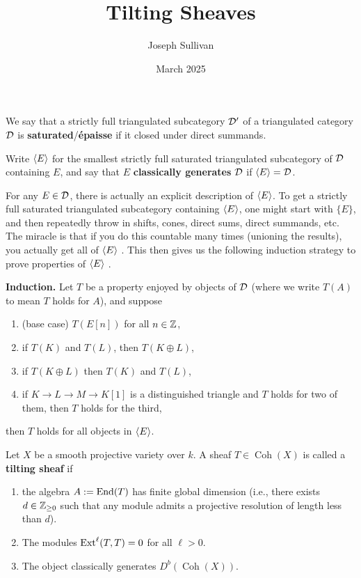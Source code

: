 \documentclass[12pt]{article}
\title{Tilting Sheaves}
\author{Joseph Sullivan}
\date{March 2025}
\DeclareMathOperator{\End}{End}
\DeclareMathOperator{\Coh}{Coh}
\begin{document}
\maketitle

\section{}

\begin{defn}
    We say that a strictly full triangulated subcategory $\mathcal{D}'$ of a triangulated category $\mathcal{D}$ is \textbf{saturated}/\textbf{\'epaisse} if it closed under direct summands.

    Write $\left\langle E\right\rangle$ for the smallest strictly full saturated triangulated subcategory of $\mathcal{D}$ containing $E$, and say that $E$ \textbf{classically generates} $\mathcal{D}$ if $\left\langle E\right\rangle=\mathcal{D}$.
\end{defn}

\begin{rmk}\label{induction-triangulated-cat}
    For any $E\in \mathcal{D}$, there is actually an explicit description of $\left\langle E\right\rangle$. To get a strictly full saturated triangulated subcategory containing $\left\langle E\right\rangle$, one might start with $\{E\}$, and then repeatedly throw in shifts, cones, direct sums, direct summands, etc. The miracle is that if you do this countable many times (unioning the results), you actually get all of $\left\langle E\right\rangle$ \cite[Lemma 13.36.2]{stacks-project}. This then gives us the following induction strategy to prove properties of $\left\langle E\right\rangle$ \cite[Remark 13.36.7]{stacks-project}.

    \textbf{Induction.} Let $T$ be a property enjoyed by objects of $\mathcal{D}$ (where we write $T(A)$ to mean $T$ holds for $A$), and suppose
    \begin{enumerate}[(1)]
        \item (base case) $T(E[n])$ for all $n\in \mathbb{Z}$,
        \item if $T(K)$ and $T(L)$, then $T(K\oplus L)$,
        \item if $T(K\oplus L)$ then $T(K)$ and $T(L)$,
        \item if $K\to L \to M \to K[1]$ is a distinguished triangle and $T$ holds for two of them, then $T$ holds for the third,
    \end{enumerate}
    then $T$ holds for all objects in $\left\langle E\right\rangle$.
\end{rmk}

\begin{defn}
    Let $X$ be a smooth projective variety over $k$. A sheaf $T\in \Coh(X)$ is called a \textbf{tilting sheaf} if
    \begin{enumerate}
        \item[(T1)] the algebra $A\defeq \End(T)$ has finite global dimension (i.e., there exists $d\in \mathbb{Z}_{\geq 0}$ such that any module admits a projective resolution of length less than $d$).
        \item[(T2)] The modules $\mathrm{Ext}^\ell(T,T)=0$ for all $\ell>0$.
        \item[(T3)] The object classically generates $D^b(\Coh(X))$.
    \end{enumerate}
\end{defn}
\end{document}
